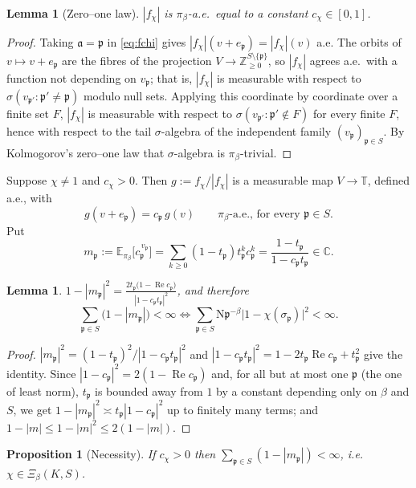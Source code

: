 \documentclass[11pt]{amsart}
\numberwithin{equation}{section}
\newtheorem{proposition}[theorem]{Proposition}
\newtheorem{lemma}[theorem]{Lemma}
\theoremstyle{definition}
\theoremstyle{remark}
\newcommand{\Z}{\mathbb{Z}}
\newcommand{\C}{\mathbb{C}}
\newcommand{\T}{\mathbb{T}}
\newcommand{\Ns}{\mathrm{N}}
\newcommand{\pp}{\mathfrak{p}}
\newcommand{\aaa}{\mathfrak{a}}
\begin{document}
\begin{lemma}[Zero--one law]\label{lem:01}
$|f_\chi|$ is $\pi_\beta$-a.e.\ equal to a constant $c_\chi\in[0,1]$.
\end{lemma}

\begin{proof}
Taking $\aaa=\pp$ in \eqref{eq:fchi} gives $|f_\chi|(v+e_\pp)=|f_\chi|(v)$
a.e. The orbits of $v\mapsto v+e_\pp$ are the fibres of the projection
$V\to\Z_{\ge0}^{S\setminus\{\pp\}}$, so $|f_\chi|$ agrees a.e.\ with a function
not depending on $v_\pp$; that is, $|f_\chi|$ is measurable with respect to
$\sigma(v_{\pp'}:\pp'\neq\pp)$ modulo null sets. Applying this coordinate by
coordinate over a finite set $F$, $|f_\chi|$ is measurable with respect to
$\sigma(v_{\pp'}:\pp'\notin F)$ for every finite $F$, hence with respect to the
tail $\sigma$-algebra of the independent family $(v_\pp)_{\pp\in S}$. By
Kolmogorov's zero--one law that $\sigma$-algebra is $\pi_\beta$-trivial.
\end{proof}

Suppose $\chi\neq1$ and $c_\chi>0$. Then $g:=f_\chi/|f_\chi|$ is a measurable
map $V\to\T$, defined a.e., with
\begin{equation}\label{eq:cob}
g(v+e_\pp)=c_\pp\,g(v)\qquad\pi_\beta\text{-a.e., for every }\pp\in S .
\end{equation}
Put
\[
m_\pp:=\mathbb E_{\pi_\beta}\bigl[c_\pp^{\,v_\pp}\bigr]=\sum_{k\ge0}(1-t_\pp)t_\pp^k c_\pp^k=\frac{1-t_\pp}{1-c_\pp t_\pp}\in\C .
\]

\begin{lemma}\label{lem:mp}
$\displaystyle 1-|m_\pp|^2=\frac{2t_\pp\bigl(1-\operatorname{Re}c_\pp\bigr)}{|1-c_\pp t_\pp|^2}$,
and therefore
\[
\sum_{\pp\in S}\bigl(1-|m_\pp|\bigr)<\infty
\iff
\sum_{\pp\in S}\Ns\pp^{-\beta}\bigl|1-\chi(\sigma_\pp)\bigr|^2<\infty .
\]
\end{lemma}

\begin{proof}
$|m_\pp|^2=(1-t_\pp)^2/|1-c_\pp t_\pp|^2$ and
$|1-c_\pp t_\pp|^2=1-2t_\pp\operatorname{Re}c_\pp+t_\pp^2$ give the identity.
Since $|1-c_\pp|^2=2(1-\operatorname{Re}c_\pp)$ and, for all but at most one
$\pp$ (the one of least norm), $t_\pp$ is bounded away from $1$ by a constant
depending only on $\beta$ and $S$, we get $1-|m_\pp|^2\asymp t_\pp|1-c_\pp|^2$
up to finitely many terms; and $1-|m|\le1-|m|^2\le2(1-|m|)$.
\end{proof}

\begin{proposition}[Necessity]\label{prop:nec}
If $c_\chi>0$ then $\sum_{\pp\in S}(1-|m_\pp|)<\infty$, i.e.\
$\chi\in\Xi_\beta(K,S)$.
\end{proposition}
\end{document}

